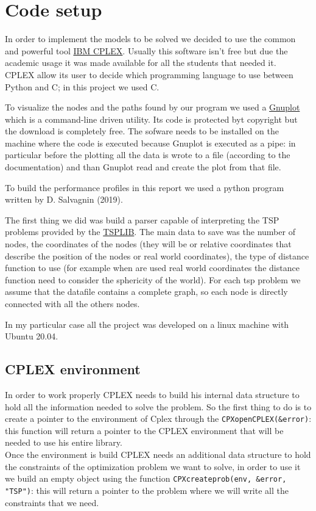 \section{Code setup}
In order to implement the models to be solved we decided to use the common and powerful tool \href{https://www.ibm.com/products/ilog-cplex-optimization-studio}{IBM CPLEX}. Usually this software isn't free but due the academic usage it was made available for all the students that needed it.\\
CPLEX allow its user to decide which programming language to use between Python and C; in this project we used C.

To visualize the nodes and the paths found by our program we used a \href{https://www.gnuplot.info}{Gnuplot} which is a command-line driven utility. Its code is protected byt copyright but the download is completely free. The sofware needs to be installed on the machine where the code is executed because Gnuplot is executed as a pipe: in particular before the plotting all the data is wrote to a file (according to the documentation) and than Gnuplot read and create the plot from that file.

To build the performance profiles in this report we used a python program written by D. Salvagnin (2019).


The first thing we did was build a parser capable of interpreting the TSP problems provided by the \href{http://comopt.ifi.uni-heidelberg.de/software/TSPLIB95/}{TSPLIB}. The main data to save was the number of nodes, the coordinates of the nodes (they will be or relative coordinates that describe the position of the nodes or real world coordinates), the type of distance function to use (for example when are used real world coordinates the distance function need to consider the sphericity of the world). For each tsp problem we assume that the datafile contains a complete graph, so each node is directly connected with all the others nodes.

In my particular case all the project was developed on a linux machine with Ubuntu 20.04.

\subsection{CPLEX environment}
\label{cap:2_int}
In order to work properly CPLEX needs to build his internal data structure to hold all the information needed to solve the problem. So the first thing to do is to create a pointer to the environment of Cplex through the \verb|CPXopenCPLEX(&error)|: this function will return a pointer to the CPLEX environment that will be needed to use his entire library.\\
Once the environment is build CPLEX needs an additional data structure to hold the constraints of the optimization problem we want to solve, in order to use it we build an empty object using the function \verb|CPXcreateprob(env, &error, "TSP")|: this will return a pointer to the problem where we will write all the constraints that we need.

